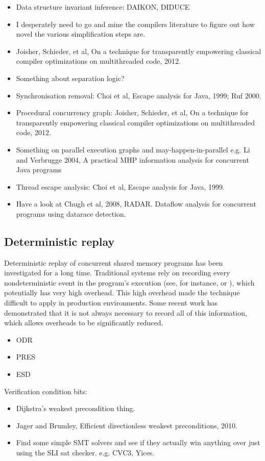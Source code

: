\begin{itemize}
\item Data structure invariant inference: DAIKON, DIDUCE
\item I desperately need to go and mine the compilers literature to
  figure out how novel the various simplification steps are.
\item
  Joisher, Schieder, et al, On a technique for transparently empowering classical compiler optimizations on multithreaded code, 2012.
\item
  Something about separation logic?
\item
  Synchronisation removal: Choi et al, Escape analysis for Java, 1999; Ruf 2000.
\item
  Procedural concurrency graph: Joisher, Schieder, et al, On a technique for transparently empowering classical compiler optimizations on multithreaded code, 2012.
\item
  Something on parallel execution graphs and may-happen-in-parallel e.g. Li and Verbrugge 2004, A practical MHP information analysis for concurrent Java programs
\item
  Thread escape analysis: Choi et al, Escape analysis for Java, 1999.
\item
  Have a look at Chugh et al, 2008, RADAR.  Dataflow analysis for concurrent programs using datarace detection.
\end{itemize}

\subsection{Deterministic replay}

Deterministic replay of concurrent shared memory programs has been
investigated for a long time.  Traditional systems rely on recording
every nondeterministic event in the program's execution (see, for
instance, \cite{LeBlanc1987} or \cite{Dunlap2002}), which potentially
has very high overhead.  This high overhead made the technique
difficult to apply in production environments.  Some recent work has
demonstrated that it is not always necessary to record all of this
information, which allows overheads to be significantly reduced.

\begin{itemize}
\item ODR
\item PRES
\item ESD
\end{itemize}



Verification condition bits:

\begin{itemize}
\item
  Dijkstra's weakest precondition thing.
\item
  Jager and Brumley, Efficient directionless weakest preconditions, 2010.
\item
  Find some simple SMT solvers and see if they actually win anything over just using the SLI sat checker.
  e.g. CVC3, Yices.
\end{itemize}
